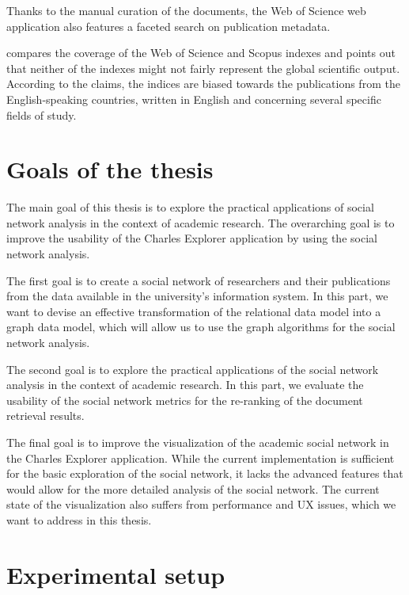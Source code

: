 Thanks to the manual curation of the documents, the Web of Science web application also features a faceted search on publication metadata.

\cite{wos-scopus-not-global} compares the coverage of the Web of Science and Scopus indexes and
points out that neither of the indexes might not fairly represent the global scientific output.
According to the claims, the indices are biased towards the publications from the English-speaking countries,
written in English and concerning several specific fields of study.

\section*{Goals of the thesis}\label{sec:goals}

The main goal of this thesis is to explore the practical applications of social network analysis 
in the context of academic research. The overarching goal is to improve the usability
of the Charles Explorer application by using the social network analysis.

The first goal is to create a social network of researchers and their publications from the data available in the university's information system.
In this part, we want to devise an effective transformation of the relational data model into a graph data model, 
which will allow us to use the graph algorithms for the social network analysis.

The second goal is to explore the practical applications of the social network analysis in the context of academic research.
In this part, we evaluate the usability of the social network metrics for the re-ranking of the document retrieval results.

The final goal is to improve the visualization of the academic social network in the Charles Explorer application.
While the current implementation is sufficient for the basic exploration of the social network, 
it lacks the advanced features that would allow for the more detailed analysis of the social network.
The current state of the visualization also suffers from performance and UX issues, which we want to address in this thesis.

\section*{Experimental setup}

